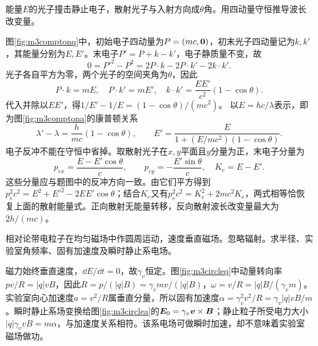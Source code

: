 \begin{exercise}\label{ex:m3compton}
能量$E$的光子撞击静止电子，散射光子与入射方向成$\theta$角。用四动量守恒推导波长改变量。
\end{exercise}
\begin{solution}
图\ref{fig:m3comptonq}中，初始电子四动量为$P=(mc,\bm{0})$，初末光子四动量记为$k,k'$，其能量分别为$E,E'$。末电子$P'=P+k-k'$，电子静质量不变，故
\[
 0=P'^2-P^2=2P\cdot k-2P\cdot k'-2k\cdot k'.
\]
光子各自平方为零，两个光子的空间夹角为$\theta$，因此
\[
 P\cdot k=mE,\quad P\cdot k'=mE',\quad
 k\cdot k'=\frac{EE'}{c^2}(1-\cos\theta).
\]
代入并除以$EE'$，得$1/E'-1/E=(1-\cos\theta)/(mc^2)$。
以$E=hc/\lambda$表示，即为图\ref{fig:m3comptona}的康普顿关系
\[
 \lambda'-\lambda=\frac h{mc}(1-\cos\theta),\qquad
 E'=\frac E{1+(E/mc^2)(1-\cos\theta)}.
\]
电子反冲不能在守恒中省掉。取散射光子在$x,y$平面且$y$分量为正，末电子分量为
\[
 p_{ex}=\frac{E-E'\cos\theta}c,\qquad
 p_{ey}=-\frac{E'\sin\theta}c,
 \quad K_e=E-E'.
\]
这些分量应与题图中的反冲方向一致。由它们平方得到$p_e^2c^2=E^2+E'^2-2EE'\cos\theta$；结合$K_e$又有$p_e^2c^2=K_e^2+2mc^2K_e$，两式相等恰恢复上面的散射能量式。正向散射无能量转移，反向散射波长改变量最大为$2h/(mc)$。
\end{solution}

\begin{exercise}\label{ex:m3circular}
相对论带电粒子在均匀磁场中作圆周运动，速度垂直磁场。忽略辐射。求半径、实验室角频率、固有加速度及瞬时静止系电场。
\end{exercise}
\begin{solution}
磁力始终垂直速度，$\dd E/\dd t=0$，故$\gamma_v$恒定。图\ref{fig:m3circleq}中动量转向率$p v/R=|q|vB$，因此$R=p/(|q|B)=\gamma_vmv/(|q|B)$，$\omega=v/R=|q|B/(\gamma_vm)$。
实验室向心加速度$a=v^2/R$属垂直分量，所以固有加速度$\alpha=\gamma_v^2v^2/R=\gamma_v|q|vB/m$。瞬时静止系场变换给图\ref{fig:m3circlea}的$\bm{E}_0=\gamma_v\bm{v}\times\bm{B}$；静止粒子所受电力大小$|q|\gamma_vvB=m\alpha$，与加速度关系相符。该系电场可做瞬时加速，却不意味着实验室磁场做功。
\end{solution}


